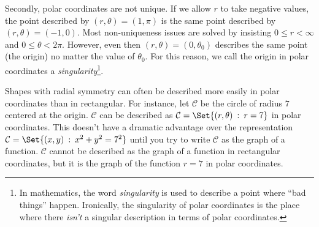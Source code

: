 Secondly, polar coordinates are not unique.  If we allow $r$ to take negative
values, the point described by $(r,\theta)=(1,\pi)$ is the same point described by $(r,\theta)=(-1,0)$.  
Most non-uniqueness issues are solved by insisting
$0\leq r <\infty$ and $0\leq\theta < 2\pi$.  However, even then 
$(r,\theta)=(0,\theta_0)$ describes the same point (the origin) no matter
the value of $\theta_0$.  For this reason,
we call the origin in polar coordinates a \emph{singularity}\footnote{ In mathematics, the word
\emph{singularity} is used to describe a point where ``bad things'' happen.  Ironically, the
singularity of polar coordinates is the place where there \emph{isn't} a singular description
in terms of polar coordinates.}.

\bigskip
Shapes with radial symmetry can often be described more easily in polar coordinates than
in rectangular.  For instance, let $\mathcal C$ be the circle of radius $7$ centered at the origin.
$\mathcal C$ can be described as
$\mathcal C=\Set{(r,\theta)\given r=7}$ in polar coordinates.  This doesn't have a dramatic
advantage over the representation $\mathcal C=\Set{(x,y)\given x^2+y^2=7^2}$ until you try to write
$\mathcal C$ as the graph of a function.  $\mathcal C$ cannot be described as the graph of a function
in rectangular coordinates, but it is the graph of the function $r=7$ in polar coordinates.


